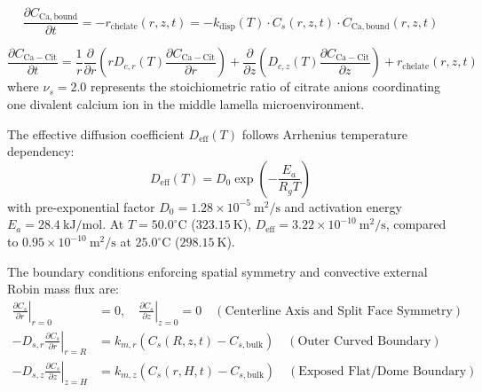 \documentclass[10pt,a4paper]{article}
\begin{document}
\begin{equation}
\label{eq:pde_ca_bound}
\frac{\partial C_{\mathrm{Ca,bound}}}{\partial t} = - r_{\mathrm{chelate}}(r, z, t) = - k_{\mathrm{disp}}(T) \cdot C_s(r, z, t) \cdot C_{\mathrm{Ca,bound}}(r, z, t)
\end{equation}

\begin{equation}
\label{eq:pde_complex}
\frac{\partial C_{\mathrm{Ca-Cit}}}{\partial t} = \frac{1}{r} \frac{\partial}{\partial r} \left( r D_{c,r}(T) \frac{\partial C_{\mathrm{Ca-Cit}}}{\partial r} \right) + \frac{\partial}{\partial z} \left( D_{c,z}(T) \frac{\partial C_{\mathrm{Ca-Cit}}}{\partial z} \right) + r_{\mathrm{chelate}}(r, z, t)
\end{equation}
where $\nu_s = 2.0$ represents the stoichiometric ratio of citrate anions coordinating one divalent calcium ion in the middle lamella microenvironment.

The effective diffusion coefficient $D_{\mathrm{eff}}(T)$ follows Arrhenius temperature dependency:
\begin{equation}
\label{eq:arrhenius_diff}
D_{\mathrm{eff}}(T) = D_0 \exp\left( - \frac{E_a}{R_g T} \right)
\end{equation}
with pre-exponential factor $D_0 = 1.28 \times 10^{-5}\ \mathrm{m^2/s}$ and activation energy $E_a = 28.4\ \mathrm{kJ/mol}$. At $T = 50.0^\circ\mathrm{C}$ ($323.15\ \mathrm{K}$), $D_{\mathrm{eff}} = 3.22 \times 10^{-10}\ \mathrm{m^2/s}$, compared to $0.95 \times 10^{-10}\ \mathrm{m^2/s}$ at $25.0^\circ\mathrm{C}$ ($298.15\ \mathrm{K}$).

The boundary conditions enforcing spatial symmetry and convective external Robin mass flux are:
\begin{align}
\label{eq:bc_symmetry}
\left. \frac{\partial C_s}{\partial r} \right|_{r=0} &= 0, \quad \left. \frac{\partial C_s}{\partial z} \right|_{z=0} = 0 \quad (\text{Centerline Axis and Split Face Symmetry}) \\
\label{eq:bc_robin_r}
- D_{s,r} \left. \frac{\partial C_s}{\partial r} \right|_{r=R} &= k_{m,r} \left( C_{s}(R, z, t) - C_{s,\mathrm{bulk}} \right) \quad (\text{Outer Curved Boundary}) \\
\label{eq:bc_robin_z}
- D_{s,z} \left. \frac{\partial C_s}{\partial z} \right|_{z=H} &= k_{m,z} \left( C_{s}(r, H, t) - C_{s,\mathrm{bulk}} \right) \quad (\text{Exposed Flat/Dome Boundary})
\end{align}
\end{document}
